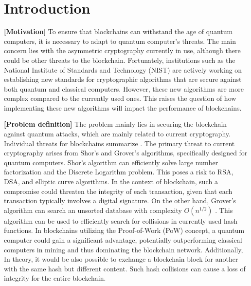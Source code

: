 \documentclass{ExcelAtFIT}
\affiliation{*%
  \href{mailto:xlasmi00@stud.fit.vutbr.cz}{xlasmi00@stud.fit.vutbr.cz},
  \textit{Faculty of Information Technology, Brno University of Technology}}
\begin{document}
\startdocument


\section{Introduction}

\textbf{[Motivation]} To ensure that blockchains can withstand the age of quantum computers, it is necessary to adapt to quantum computer's threats. The main concern lies with the asymmetric cryptography currently in use, although there could be other threats to the blockchain. Fortunately, institutions such as the National Institute of Standards and Technology (NIST) are actively working on establishing new standards for cryptographic algorithms that are secure against both quantum and classical computers. However, these new algorithms are more complex compared to the currently used ones. This raises the question of how implementing these new algorithms will impact the performance of blockchains.

\textbf{[Problem definition]} The problem mainly lies in securing the blockchain against quantum attacks, which are mainly related to current cryptography. Individual threats for blockchains summarize . The primary threat to current cryptography arises from Shor's and Grover's algorithms, specifically designed for quantum computers. Shor's algorithm \cite{shore.alg} can efficiently solve large number factorization and the Discrete Logarithm problem. This poses a risk to RSA, DSA, and elliptic curve algorithms. In the context of blockchain, such a compromise could threaten the integrity of each transaction, given that each transaction typically involves a digital signature.
On the other hand, Grover's algorithm \cite{grover.alg} can search an unsorted database with complexity $O(n^{1/2})$ \cite{pqc.review.10048976}. This algorithm can be used to efficiently search for collisions in currently used hash functions. In blockchains utilizing the Proof-of-Work (PoW) concept, a quantum computer could gain a significant advantage, potentially outperforming classical computers in mining and thus dominating the blockchain network. Additionally, In theory, it would be also possible to exchange a blockchain block for another with the same hash but different content. Such hash collisions can cause a loss of integrity for the entire blockchain.
\end{document}
